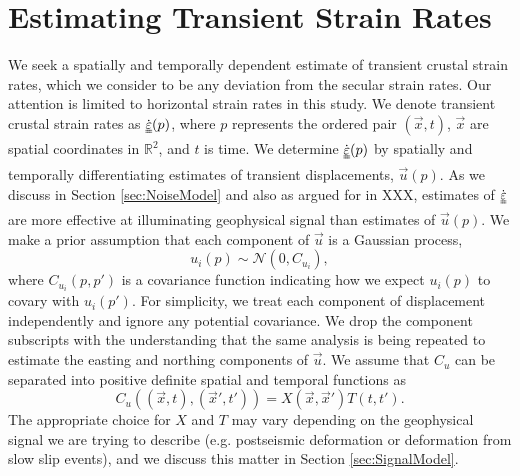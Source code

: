 \documentclass[10pt,letter]{article}
\newcommand*{\du}[1]{\uuline{#1}}
\begin{document}
\section{Estimating Transient Strain Rates}\label{sec:Method}
We seek a spatially and temporally dependent estimate of transient crustal strain rates, which we consider to be any deviation from the secular strain rates. Our attention is limited to horizontal strain rates in this study. We denote transient crustal strain rates as $\dot{\du{\varepsilon}}(p)$, where $p$ represents the ordered pair $(\vec{x},t)$, $\vec{x}$ are spatial coordinates in $\mathbb{R}^2$, and $t$ is time. We determine $\dot{\du{\varepsilon}}(p)$ by spatially and temporally differentiating estimates of transient displacements, $\vec{u}(p)$.  As we discuss in Section \ref{sec:NoiseModel} and also as argued for in XXX, estimates of $\dot{\du{\varepsilon}}$ are more effective at illuminating geophysical signal than estimates of $\vec{u}(p)$. We make a prior assumption that each component of $\vec{u}$ is a Gaussian process,
\begin{equation}\label{eq:TransientDeformation}
u_i(p) \sim \mathcal{N}\left(0,C_{u_i}\right),
\end{equation}
where $C_{u_i}(p,p')$ is a covariance function indicating how we expect $u_i(p)$ to covary with $u_i(p')$. For simplicity, we treat each component of displacement independently and ignore any potential covariance. We drop the component subscripts with the understanding that the same analysis is being repeated to estimate the easting and northing components of $\vec{u}$. We assume that $C_u$ can be separated into positive definite spatial and temporal functions as 
\begin{equation}\label{eq:TransientCovariance}
C_{u}\left((\vec{x},t),(\vec{x}',t')\right) = X(\vec{x},\vec{x}')T(t,t').
\end{equation}  
The appropriate choice for $X$ and $T$ may vary depending on the geophysical signal we are trying to describe (e.g. postseismic deformation or deformation from slow slip events), and we discuss this matter in Section \ref{sec:SignalModel}.  
\end{document}
